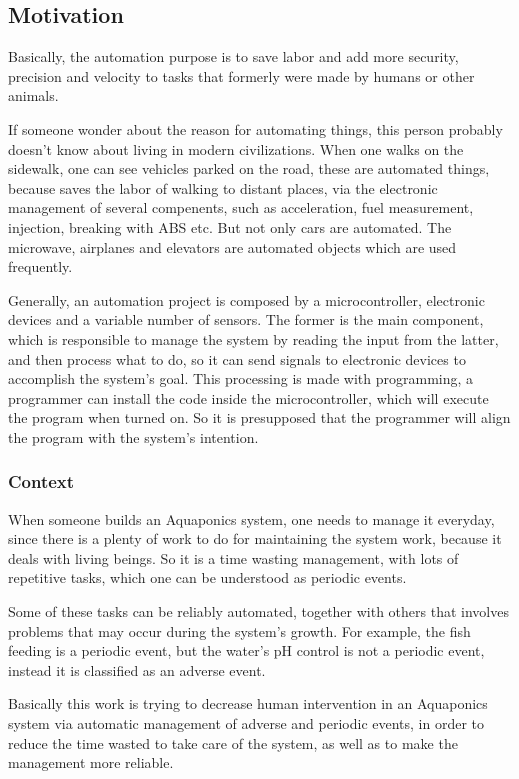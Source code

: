 \subsection{Motivation}
Basically,
the automation purpose is to save labor and add more security,
precision and velocity to tasks that formerly were made by humans or other animals.

If someone wonder about the reason for automating things,
this person probably doesn't know about living in modern civilizations.
When one walks on the sidewalk,
one can see vehicles parked on the road,
these are automated things,
because saves the labor of walking to distant places,
via the electronic management of several compenents,
such as acceleration,
fuel measurement,
injection,
breaking with ABS etc.
But not only cars are automated.
The microwave,
airplanes and elevators are automated objects which are used frequently.

Generally, 
an automation project is composed by a microcontroller, 
electronic devices and a variable number of sensors.
The former is the main component,
which is responsible to manage the system by reading the input from the latter,
and then process what to do,
so it can send signals to electronic devices to accomplish the system's goal.
This processing is made with programming,
a programmer can install the code inside the microcontroller,
which will execute the program when turned on.
So it is presupposed that the programmer will align the program with the system's intention.

\subsubsection{Context}
When someone builds an Aquaponics system,
one needs to manage it everyday,
since there is a plenty of work to do for maintaining the system work,
because it deals with living beings.
So it is a time wasting management,
with lots of repetitive tasks,
which one can be understood as periodic events.

Some of these tasks can be reliably automated,
together with others that involves problems that may occur during the system's growth.
For example, the fish feeding is a periodic event,
but the water's pH control is not a periodic event,
instead it is classified as an adverse event.

Basically this work is trying to decrease human intervention in an Aquaponics system via automatic management of adverse and periodic events,
in order to reduce the time wasted to take care of the system, 
as well as to make the management more reliable.


